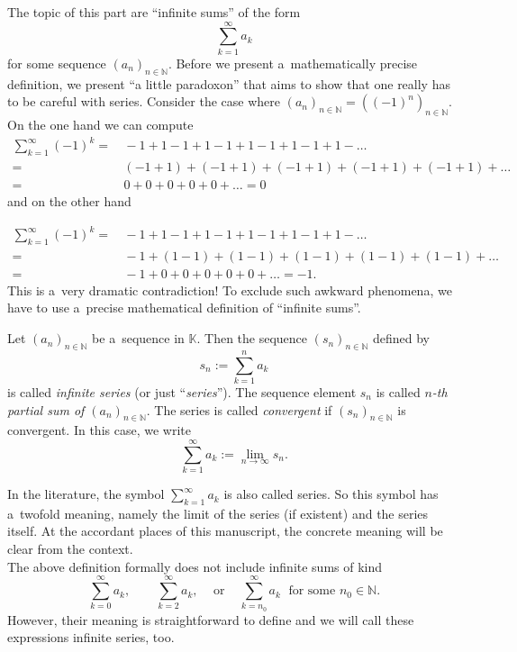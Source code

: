 


The topic of this part are ``infinite sums'' of the form
\[\sum_{k=1}^\infty a_k\]
for some sequence  $(a_n)_{n\in\mathbb{N}}$. 
Before we present a~mathematically precise definition, we present ``a little paradoxon'' 
that aims to show that one really has to be careful with series.
Consider the case where $(a_n)_{n\in\mathbb{N}}=((-1)^n)_{n\in\mathbb{N}}$. On the one hand we can compute
\begin{align*}
 \sum_{k=1}^\infty (-1)^k=&\,-1+1-1+1-1+1-1+1-1+1-\ldots\\[-0.4cm]=&\,(-1+1)+(-1+1)+(-1+1)+(-1+1)+(-1+1)+\ldots\\=&\,0+0+0+0+0+\ldots=0
\end{align*}
and on the other hand

\begin{align*}
 \sum_{k=1}^\infty (-1)^k=&\,-1+1-1+1-1+1-1+1-1+1-\ldots\\[-0.4cm]=&\,-1+(1-1)+(1-1)+(1-1)+(1-1)+(1-1)+\ldots\\=&\,-1+0+0+0+0+0+\ldots=-1.
\end{align*}
This is a~very dramatic contradiction! To exclude such awkward phenomena, we have to use a~precise mathematical definition
of ``infinite sums''.

\begin{Definition}
    Let $(a_n)_{n\in\mathbb{N}}$ be a~sequence in $\mathbb{K}$. Then the sequence $(s_n)_{n\in\mathbb{N}}$ defined by
\[s_n:=\sum_{k=1}^na_k\]
is called \emph{infinite series} (or just ``\emph{series}''). The sequence element $s_n$ is called \emph{$n$-th partial sum of $(a_n)_{n\in\mathbb{N}}$}.  
The series is called \emph{convergent} if  $(s_n)_{n\in\mathbb{N}}$ is convergent. In this case, we write
\[\sum_{k=1}^\infty a_k:=\lim_{n\to\infty}s_n.\]
\end{Definition}
\begin{Remark}{}
In the literature, the symbol $\sum_{k=1}^\infty a_k$ is also called series. So this symbol has a~twofold meaning, 
namely the limit of the series (if existent) and the series itself. At the accordant places of this manuscript, the concrete meaning will be clear from the context.\\
The above definition formally does not include infinite sums of kind
\[\sum_{k=0}^\infty a_k,\qquad\sum_{k=2}^\infty a_k,\;\;\;\text{ or }\;\;\; \sum_{k=n_0}^\infty a_k\;\text{ for some }n_0\in\mathbb{N}.\]
However, their meaning is straightforward to define and we will call these expressions infinite series, too.
\end{Remark}

